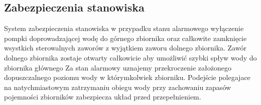 \subsection{Zabezpieczenia stanowiska}
\label{lab:zad8}

System zabezpieczenia stanowiska w przypadku stanu alarmowego wyłączenie pompki doprowadzającej
wodę do górnego zbiornika oraz całkowite zamknięcie wsystkich sterowalnych zaworów z 
wyjątkiem zaworu dolnego zbiornika. Zawór dolnego zbiornika zostaje otwarty całkowicie 
aby umożliwić szybki spływ wody do zbiornika głównego
\newline
Za stan alarmowy uznajemy przekroczenie założonego dopuszczalnego poziomu wody
w którymkolwiek zbiorniku.
\newline
Podejście polegajace na natychmiastowym zatrzymaniu obiegu wody 
przy zachowaniu zapasów pojemności zbiorników zabezpiecza układ przed 
przepełnieniem.


\newpage
